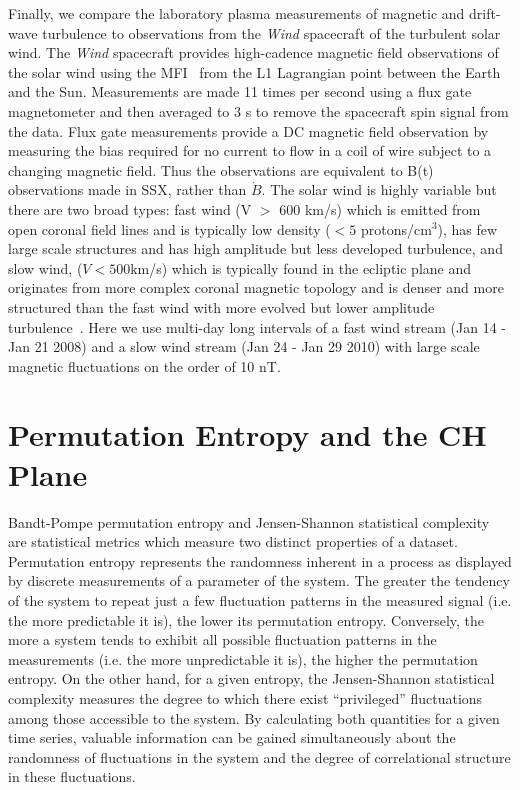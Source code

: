 \documentclass[aps,prx,twocolumn,secnumarabic,nobalancelastpage,amsmath,amssymb,
nofootinbib]{revtex4-1}
\begin{document}
Finally, we compare the laboratory plasma measurements of magnetic and drift-wave turbulence to observations from the {\it Wind} spacecraft of the turbulent solar wind. The {\it Wind} spacecraft provides high-cadence magnetic field observations of the solar wind using the MFI~\cite{lepping1995} from the L1 Lagrangian point between the Earth and the Sun. Measurements are made 11 times per second using a flux gate magnetometer and then averaged to 3 s to remove the spacecraft spin signal from the data. Flux gate measurements provide a DC magnetic field observation by measuring the bias required for no current to flow in a coil of wire subject to a changing magnetic field. Thus the observations are equivalent to B(t) observations made in SSX, rather than $\dot{B}$. The solar wind is highly variable but there are two broad types: fast wind (V $>$ 600 km/s) which is emitted from open coronal field lines and is typically low density ($< 5$ protons/cm$^3$), has few large scale structures and has high amplitude but less developed turbulence, and slow wind, ($V < 500 $km/s) which is typically found in the ecliptic plane and originates from more complex coronal magnetic topology and is denser and more structured than the fast wind with more evolved but lower amplitude turbulence~\cite{tu1990,bruno2013}. Here we use multi-day long intervals of a fast wind stream (Jan 14 - Jan 21 2008) and a slow wind stream (Jan 24 - Jan 29 2010) with large scale magnetic fluctuations on the order of 10 nT. 



\section{Permutation Entropy and the CH Plane}
Bandt-Pompe permutation entropy and Jensen-Shannon statistical complexity are statistical metrics which measure two distinct properties of a dataset. Permutation entropy represents the randomness inherent in a process as displayed by discrete measurements of a parameter of the system. The greater the tendency of the system to repeat just a few fluctuation patterns in the measured signal (i.e. the more predictable it is), the lower its permutation entropy. Conversely, the more a system tends to exhibit all possible fluctuation patterns in the measurements (i.e. the more unpredictable it is), the higher the permutation entropy. On the other hand, for a given entropy, the Jensen-Shannon statistical complexity measures the degree to which there exist “privileged” fluctuations among those accessible to the system. By calculating both quantities for a given time series, valuable information can be gained simultaneously about the randomness of fluctuations in the system and the degree of correlational structure in these fluctuations. 
\end{document}
